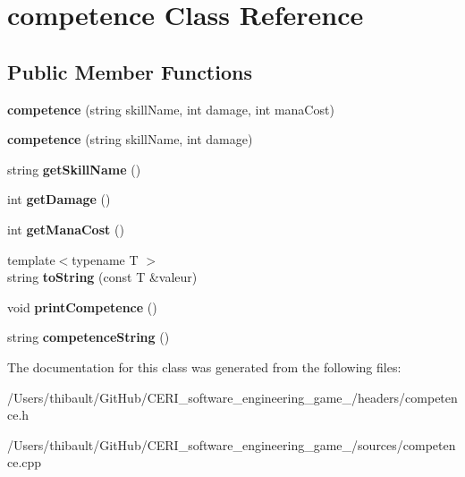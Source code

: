 \hypertarget{classcompetence}{}\section{competence Class Reference}
\label{classcompetence}
\subsection*{Public Member Functions}
\begin{DoxyCompactItemize}
\item 
\mbox{\label{classcompetence_a143386f1df81f37984cc803e1473a95b}} 
{\bfseries competence} (string skill\+Name, int damage, int mana\+Cost)
\item 
\mbox{\label{classcompetence_aa2c9863d2e96e6e7c5d4ba73fa70f614}} 
{\bfseries competence} (string skill\+Name, int damage)
\item 
\mbox{\label{classcompetence_af332733d20997bc99fd8ea8d455d6e9e}} 
string {\bfseries get\+Skill\+Name} ()
\item 
\mbox{\label{classcompetence_a752380fae93494815023b3a177e57f44}} 
int {\bfseries get\+Damage} ()
\item 
\mbox{\label{classcompetence_a8346c6ae95df148e42f26b9a94655c8f}} 
int {\bfseries get\+Mana\+Cost} ()
\item 
\mbox{\label{classcompetence_a1e4d33c0a621a8f0206921739b0e7507}} 
{\footnotesize template$<$typename T $>$ }\\string {\bfseries to\+String} (const T \&valeur)
\item 
\mbox{\label{classcompetence_a5e486c7db01680742633e93c42a638b3}} 
void {\bfseries print\+Competence} ()
\item 
\mbox{\label{classcompetence_a01f29cf5b6bc4dffaf58979dbd342420}} 
string {\bfseries competence\+String} ()
\end{DoxyCompactItemize}


The documentation for this class was generated from the following files\+:\begin{DoxyCompactItemize}
\item 
/\+Users/thibault/\+Git\+Hub/\+C\+E\+R\+I\+\_\+software\+\_\+engineering\+\_\+game\+\_/headers/competence.\+h\item 
/\+Users/thibault/\+Git\+Hub/\+C\+E\+R\+I\+\_\+software\+\_\+engineering\+\_\+game\+\_/sources/competence.\+cpp\end{DoxyCompactItemize}

